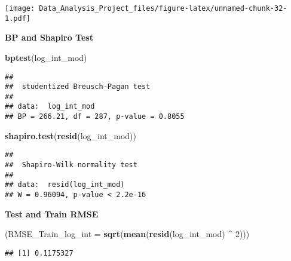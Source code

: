 \documentclass[]{article}
\newenvironment{Shaded}{\begin{snugshade}}{\end{snugshade}}
\newcommand{\KeywordTok}[1]{\textcolor[rgb]{0.13,0.29,0.53}{\textbf{#1}}}
\newcommand{\DataTypeTok}[1]{\textcolor[rgb]{0.13,0.29,0.53}{#1}}
\newcommand{\DecValTok}[1]{\textcolor[rgb]{0.00,0.00,0.81}{#1}}
\newcommand{\StringTok}[1]{\textcolor[rgb]{0.31,0.60,0.02}{#1}}
\newcommand{\OperatorTok}[1]{\textcolor[rgb]{0.81,0.36,0.00}{\textbf{#1}}}
\newcommand{\NormalTok}[1]{#1}
\begin{document}
\texttt{[image: Data\_Analysis\_Project\_files/figure-latex/unnamed-chunk-32-1.pdf]}

\textbf{BP and Shapiro Test }

\begin{Shaded}
\begin{Highlighting}[]
\KeywordTok{bptest}\NormalTok{(log_int_mod)}
\end{Highlighting}
\end{Shaded}

\begin{verbatim}
## 
##  studentized Breusch-Pagan test
## 
## data:  log_int_mod
## BP = 266.21, df = 287, p-value = 0.8055
\end{verbatim}

\begin{Shaded}
\begin{Highlighting}[]
\KeywordTok{shapiro.test}\NormalTok{(}\KeywordTok{resid}\NormalTok{(log_int_mod))}
\end{Highlighting}
\end{Shaded}

\begin{verbatim}
## 
##  Shapiro-Wilk normality test
## 
## data:  resid(log_int_mod)
## W = 0.96094, p-value < 2.2e-16
\end{verbatim}

\textbf{Test and Train RMSE}

\begin{Shaded}
\begin{Highlighting}[]
\NormalTok{ (}\DataTypeTok{RMSE_Train_log_int =} \KeywordTok{sqrt}\NormalTok{(}\KeywordTok{mean}\NormalTok{(}\KeywordTok{resid}\NormalTok{(log_int_mod) }\OperatorTok{^}\StringTok{ }\DecValTok{2}\NormalTok{)))}
\end{Highlighting}
\end{Shaded}

\begin{verbatim}
## [1] 0.1175327
\end{verbatim}

\begin{Shaded}
\end{Shaded}
\end{document}
